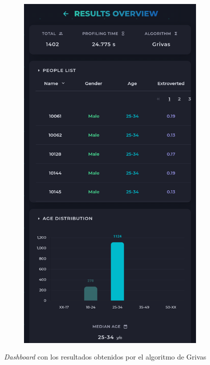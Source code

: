 \begin{figure}[H]
\begin{subfigure}[c]{0.21\textwidth}
		\includegraphics[width=\textwidth]{imagenes/dashboard-grivas-500_movil.png}
		\label{fig:casouso_dashboard_grivas_movil}
	\end{subfigure}
	\vspace{-1\baselineskip}
	\caption{\textit{Dashboard} con los resultados obtenidos por el algoritmo de Grivas \cite{grivas2015author}}
	\label{fig:casouso_dashboard_grivas}
\end{figure}

